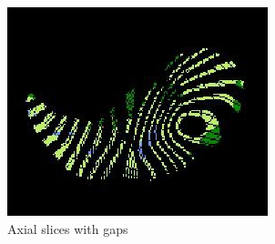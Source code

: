 \begin{figure}[htbp] 
\centering
\begin{subfigure}{.28\linewidth}%
  \includegraphics[width=\linewidth,trim={{.0\wd0} {.0\wd0} {.0\wd0} {.0\wd0}},clip]{QuantitativeAnalysis/Image/GapFilling1.jpg} %
  \caption{Axial slices with gaps\\ \quad}
  \label{fig:GapFilling-a} 
\end{subfigure} 
\hspace{.5in} %
\begin{subfigure}{.28\linewidth}%

\end{subfigure}
\end{figure}
